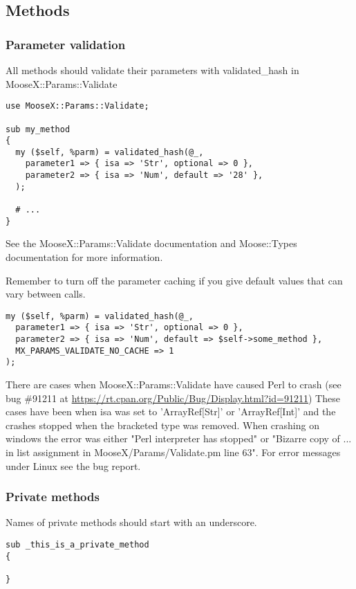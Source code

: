 \subsection{Methods}

\subsubsection{Parameter validation}
All methods should validate their parameters with validated\_hash in \mbox{MooseX::Params::Validate}

\begin{verbatim}
use MooseX::Params::Validate;

sub my_method
{
  my ($self, %parm) = validated_hash(@_,
    parameter1 => { isa => 'Str', optional => 0 },
    parameter2 => { isa => 'Num', default => '28' },
  );

  # ...
}
\end{verbatim}

See the MooseX::Params::Validate documentation \cite{params} and Moose::Types documentation \cite{types} for more information.

Remember to turn off the parameter caching if you give default values that can vary between calls.

\begin{verbatim}
my ($self, %parm) = validated_hash(@_,
  parameter1 => { isa => 'Str', optional => 0 },
  parameter2 => { isa => 'Num', default => $self->some_method },
  MX_PARAMS_VALIDATE_NO_CACHE => 1
);
\end{verbatim}

There are cases when MooseX::Params::Validate have caused Perl to crash (see bug \#91211 at \url{https://rt.cpan.org/Public/Bug/Display.html?id=91211})
These cases have been when isa was set to 'ArrayRef[Str]' or 'ArrayRef[Int]' and the crashes stopped when the bracketed type was removed. When crashing on windows the error was either "Perl interpreter has stopped" or "Bizarre copy of ... in list assignment in MooseX/Params/Validate.pm line 63". For error messages under Linux see the bug report.


\subsubsection{Private methods}

Names of private methods should start with an underscore.
\begin{verbatim}
sub _this_is_a_private_method
{

}
\end{verbatim}


